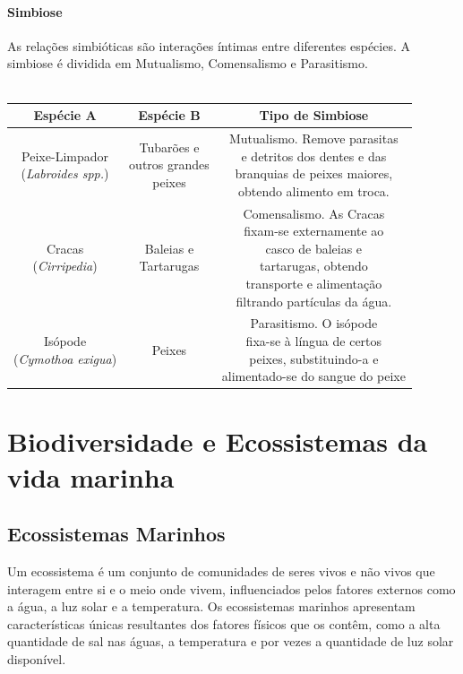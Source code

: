 \documentclass{report}
\begin{document}
\subsubsection{Simbiose}
As relações simbióticas são interações íntimas entre diferentes espécies. A simbiose é dividida em Mutualismo, Comensalismo e Parasitismo.
\\
\\
\begin{tabular}{|c|c|c|} \hline
    Espécie A & Espécie B & Tipo de Simbiose \\ \hline
    \makecell{Peixe-Limpador \\(\textit{Labroides spp.})} & \makecell{Tubarões e \\outros grandes \\peixes} & \makecell{Mutualismo. Remove parasitas \\e detritos dos dentes e das \\branquias de peixes maiores, \\obtendo alimento em troca.} \\ \hline
    \makecell{Cracas \\(\textit{Cirripedia})} & \makecell{Baleias e \\Tartarugas} & \makecell{Comensalismo. As Cracas \\fixam-se externamente ao \\casco de baleias e 	\\tartarugas, obtendo \\transporte e alimentação \\filtrando partículas da água.} \\ \hline
    \makecell{Isópode \\(\textit{Cymothoa exigua})} & Peixes & \makecell{Parasitismo. O isópode \\fixa-se à língua de certos \\peixes, substituindo-a e \\ alimentado-se do sangue do peixe} \\ \hline
\end{tabular}


\chapter{Biodiversidade e Ecossistemas da vida marinha}
\label{chap.biodiversidade}

\section{Ecossistemas Marinhos}
Um ecossistema é um conjunto de comunidades de seres vivos e não vivos que interagem entre si e o meio onde vivem, influenciados pelos fatores externos como a água, a luz solar e a temperatura. Os ecossistemas marinhos apresentam características únicas resultantes dos fatores físicos que os contêm, como a alta quantidade de sal nas águas, a temperatura e por vezes a quantidade de luz solar disponível.
\end{document}

